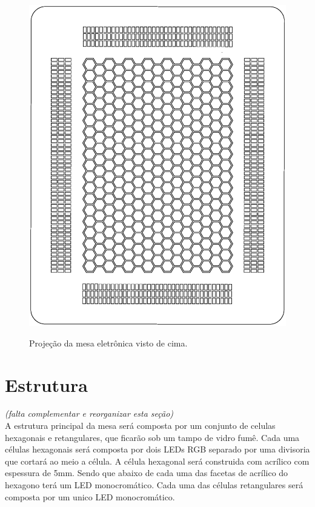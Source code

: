 \documentclass[a4paper,10pt]{article}
\begin{document}
\begin{center}
\begin{figure}[h!]
	\center
	\includegraphics[angle=0, scale=0.40]{./img/layout-v02.ps}
	\label{figura_layout}
	\caption{Projeção da mesa eletrônica visto de cima.}
\end{figure}
\end{center}

\section{Estrutura}


{\it (falta complementar e reorganizar esta seção)} \\

A estrutura principal da mesa será composta por um conjunto de celulas hexagonais e retangulares, que ficarão sob um tampo de vidro fumê. 
Cada uma células hexagonais será composta por dois LEDs RGB separado por uma divisoria que cortará ao meio a célula. 
A célula hexagonal será construida com acrílico com espessura de 5mm. Sendo que abaixo de cada uma das facetas de acrílico do hexagono terá um LED monocro\-mático.
Cada uma das células retangulares será composta por um unico LED monocromático. \\
\end{document}
